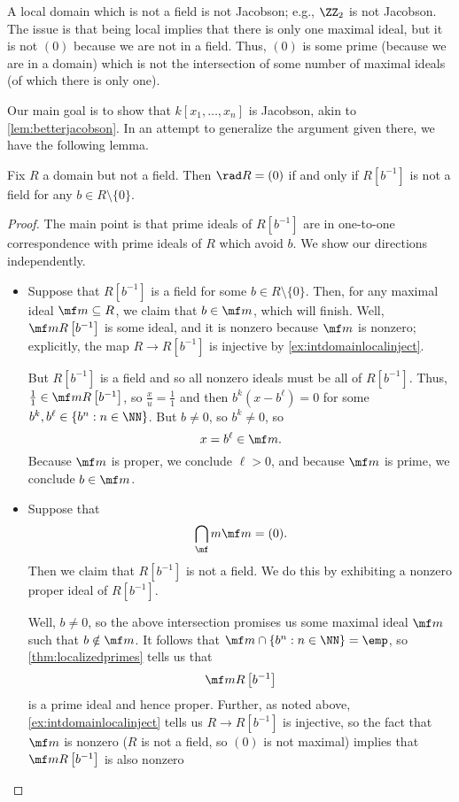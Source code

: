 \begin{nex}
	A local domain which is not a field is not Jacobson; e.g., $\ZZ_2$ is not Jacobson. The issue is that being local implies that there is only one maximal ideal, but it is not $(0)$ because we are not in a field. Thus, $(0)$ is some prime (because we are in a domain) which is not the intersection of some number of maximal ideals (of which there is only one).
\end{nex}
Our main goal is to show that $k[x_1,\ldots,x_n]$ is Jacobson, akin to \autoref{lem:betterjacobson}. In an attempt to generalize the argument given there, we have the following lemma.
\begin{lemma} \label{lem:rabinowitch}
	Fix $R$ a domain but not a field. Then $\rad R=(0)$ if and only if $R\left[b^{-1}\right]$ is not a field for any $b\in R\setminus\{0\}$.
\end{lemma}
\begin{proof}
	The main point is that prime ideals of $R\left[b^{-1}\right]$ are in one-to-one correspondence with prime ideals of $R$ which avoid $b$. We show our directions independently.
	\begin{itemize}
		\item Suppose that $R\left[b^{-1}\right]$ is a field for some $b\in R\setminus\{0\}$. Then, for any maximal ideal $\mf m\subseteq R$, we claim that $b\in\mf m$, which will finish. Well, $\mf mR\left[b^{-1}\right]$ is some ideal, and it is nonzero because $\mf m$ is nonzero; explicitly, the map $R\to R\left[b^{-1}\right]$ is injective by \autoref{ex:intdomainlocalinject}.

		But $R\left[b^{-1}\right]$ is a field and so all nonzero ideals must be all of $R\left[b^{-1}\right]$. Thus, $\frac11\in\mf mR\left[b^{-1}\right]$, so $\frac xu=\frac11$ and then $b^k\left(x-b^\ell\right)=0$ for some $b^k,b^\ell\in\left\{b^n:n\in\NN\right\}$. But $b\ne0$, so $b^k\ne0$, so
		\[x=b^\ell\in\mf m.\]
		Because $\mf m$ is proper, we conclude $\ell>0$, and because $\mf m$ is prime, we conclude $b\in\mf m$.

		\item Suppose that
		\[\bigcap_\mf m\mf m=(0).\]
		Then we claim that $R\left[b^{-1}\right]$ is not a field. We do this by exhibiting a nonzero proper ideal of $R\left[b^{-1}\right]$.
		
		Well, $b\ne0$, so the above intersection promises us some maximal ideal $\mf m$ such that $b\notin\mf m$. It follows that $\mf m\cap\{b^n:n\in\NN\}=\emp$, so \autoref{thm:localizedprimes} tells us that
		\[\mf mR\left[b^{-1}\right]\]
		is a prime ideal and hence proper. Further, as noted above, \autoref{ex:intdomainlocalinject} tells us $R\to R\left[b^{-1}\right]$ is injective, so the fact that $\mf m$ is nonzero ($R$ is not a field, so $(0)$ is not maximal) implies that $\mf mR\left[b^{-1}\right]$ is also nonzero
		\qedhere
	\end{itemize}
\end{proof}
